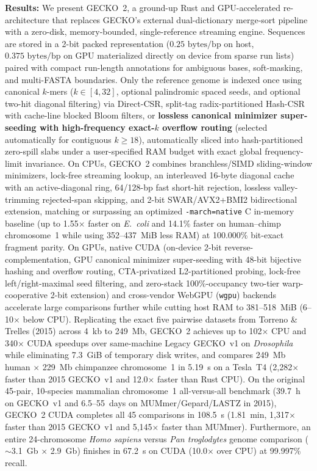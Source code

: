 \documentclass[pdflatex,sn-vancouver,Numbered]{sn-jnl}
\newcommand{\hlDrosSpeedupCpuVsVone}{102$\times$}
\newcommand{\hlDrosSpeedupCudaVsVone}{340$\times$}
\newcommand{\hlDrosVoneDiskGiB}{7.3~GiB}
\newcommand{\hlChrOneSpeedupCudaVsCpu}{12.0$\times$}
\newcommand{\hlChrOneSpeedupCudaVsPub}{2,282$\times$}
\newcommand{\hlAllVsAllCudaMin}{1.81~min}
\newcommand{\hlAllVsAllCudaSec}{108.5~s}
\newcommand{\hlAllVsAllSpeedupVsPubVone}{1,317$\times$}
\newcommand{\hlAllVsAllSpeedupVsMummer}{5,145$\times$}
\newcommand{\hlWholeGenomeCudaSec}{67.2~s}
\newcommand{\hlWholeGenomeCudaSp}{10.0$\times$}
\newcommand{\hlExactParityPct}{100.000\%}
\newcommand{\eOneChrOneCuda}{5.19}
\begin{document}
{\textbf{Results:} We present GECKO~2, a ground-up Rust and GPU-accelerated re-architecture that replaces GECKO's external dual-dictionary merge-sort pipeline with a zero-disk, memory-bounded, single-reference streaming engine. Sequences are stored in a 2-bit packed representation ($0.25\text{ bytes/bp}$ on host, $0.375\text{ bytes/bp}$ on GPU materialized directly on device from sparse run lists) paired with compact run-length annotations for ambiguous bases, soft-masking, and multi-FASTA boundaries. Only the reference genome is indexed once using canonical $k$-mers ($k \in [4,32]$, optional palindromic spaced seeds, and optional two-hit diagonal filtering) via Direct-CSR, split-tag radix-partitioned Hash-CSR with cache-line blocked Bloom filters, or \textbf{lossless canonical minimizer super-seeding with high-frequency exact-$k$ overflow routing} (selected automatically for contiguous $k \ge 18$), automatically sliced into hash-partitioned zero-spill slabs under a user-specified RAM budget with exact global frequency-limit invariance. On CPUs, GECKO~2 combines branchless/SIMD sliding-window minimizers, lock-free streaming lookup, an interleaved 16-byte diagonal cache with an active-diagonal ring, 64/128-bp fast short-hit rejection, lossless valley-trimming rejected-span skipping, and 2-bit SWAR/AVX2+BMI2 bidirectional extension, matching or surpassing an optimized \texttt{-march=native} C in-memory baseline (up to 1.55$\times$ faster on \textit{E.~coli} and 14.1\% faster on human--chimp chromosome~1 while using 352--437~MiB less RAM) at \hlExactParityPct{} bit-exact fragment parity. On GPUs, native CUDA (on-device 2-bit reverse-complementation, GPU canonical minimizer super-seeding with 48-bit bijective hashing and overflow routing, CTA-privatized L2-partitioned probing, lock-free left/right-maximal seed filtering, and zero-stack 100\%-occupancy two-tier warp-cooperative 2-bit extension) and cross-vendor WebGPU (\texttt{wgpu}) backends accelerate large comparisons further while cutting host RAM to 381--518~MiB (6--10$\times$ below CPU). Replicating the exact five pairwise datasets from Torreno \& Trelles (2015) across 4~kb to 249~Mb, GECKO~2 achieves up to \hlDrosSpeedupCpuVsVone{} CPU and \hlDrosSpeedupCudaVsVone{} CUDA speedups over same-machine Legacy GECKO~v1 on \textit{Drosophila} while eliminating \hlDrosVoneDiskGiB{} of temporary disk writes, and compares 249~Mb human $\times$ 229~Mb chimpanzee chromosome~1 in \eOneChrOneCuda{}~s on a Tesla~T4 (\hlChrOneSpeedupCudaVsPub{} faster than 2015 GECKO~v1 and \hlChrOneSpeedupCudaVsCpu{} faster than Rust CPU). On the original 45-pair, 10-species mammalian chromosome~1 all-versus-all benchmark (39.7~h on GECKO~v1 and 6.5--55~days on MUMmer/Gepard/LASTZ in 2015), GECKO~2 CUDA completes all 45 comparisons in \hlAllVsAllCudaSec{} (\hlAllVsAllCudaMin{}, \hlAllVsAllSpeedupVsPubVone{} faster than 2015 GECKO~v1 and \hlAllVsAllSpeedupVsMummer{} faster than MUMmer). Furthermore, an entire 24-chromosome \textit{Homo sapiens} versus \textit{Pan troglodytes} genome comparison ($\sim$3.1~Gb $\times$ 2.9~Gb) finishes in \hlWholeGenomeCudaSec{} on CUDA (\hlWholeGenomeCudaSp{} over CPU) at 99.997\% recall.

}
\end{document}
